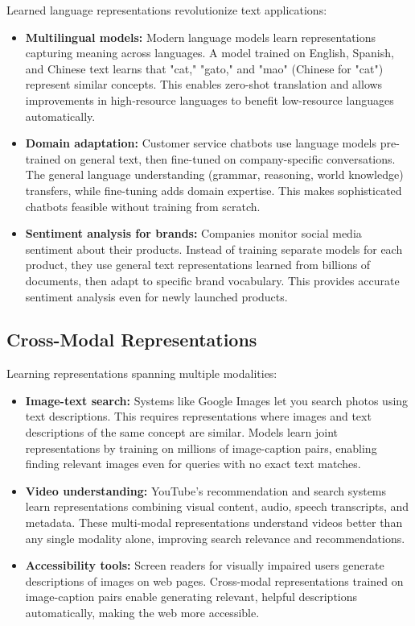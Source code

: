 Learned language representations revolutionize text applications:

\begin{itemize}
    \item \textbf{Multilingual models:} Modern language models learn representations capturing meaning across languages. A model trained on English, Spanish, and Chinese text learns that "cat," "gato," and "mao" (Chinese for "cat") represent similar concepts. This enables zero-shot translation and allows improvements in high-resource languages to benefit low-resource languages automatically.
    
    \item \textbf{Domain adaptation:} Customer service chatbots use language models pre-trained on general text, then fine-tuned on company-specific conversations. The general language understanding (grammar, reasoning, world knowledge) transfers, while fine-tuning adds domain expertise. This makes sophisticated chatbots feasible without training from scratch.
    
    \item \textbf{Sentiment analysis for brands:} Companies monitor social media sentiment about their products. Instead of training separate models for each product, they use general text representations learned from billions of documents, then adapt to specific brand vocabulary. This provides accurate sentiment analysis even for newly launched products.
\end{itemize}

\subsection{Cross-Modal Representations}

Learning representations spanning multiple modalities:

\begin{itemize}
    \item \textbf{Image-text search:} Systems like Google Images let you search photos using text descriptions. This requires representations where images and text descriptions of the same concept are similar. Models learn joint representations by training on millions of image-caption pairs, enabling finding relevant images even for queries with no exact text matches.
    
    \item \textbf{Video understanding:} YouTube's recommendation and search systems learn representations combining visual content, audio, speech transcripts, and metadata. These multi-modal representations understand videos better than any single modality alone, improving search relevance and recommendations.
    
    \item \textbf{Accessibility tools:} Screen readers for visually impaired users generate descriptions of images on web pages. Cross-modal representations trained on image-caption pairs enable generating relevant, helpful descriptions automatically, making the web more accessible.
\end{itemize}

